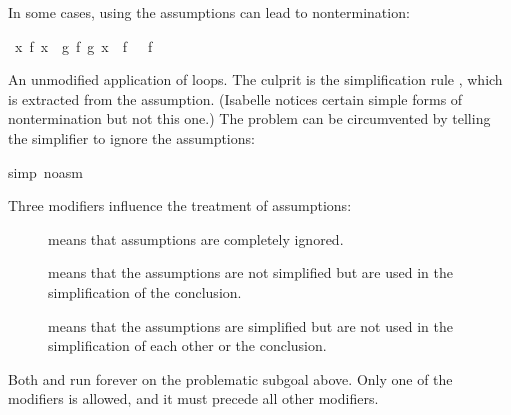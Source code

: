 \begin{isabellebody}
\begin{isamarkuptext}
In some cases, using the assumptions can lead to nontermination:%
\end{isamarkuptext}%
\isamarkuptrue%
\ {\isachardoublequote}{\isasymforall}x{\isachardot}\ f\ x\ {\isacharequal}\ g\ {\isacharparenleft}f\ {\isacharparenleft}g\ x{\isacharparenright}{\isacharparenright}\ {\isasymLongrightarrow}\ f\ {\isacharbrackleft}{\isacharbrackright}\ {\isacharequal}\ f\ {\isacharbrackleft}{\isacharbrackright}\ {\isacharat}\ {\isacharbrackleft}{\isacharbrackright}{\isachardoublequote}\isamarkupfalse%
%
\begin{isamarkuptxt}%
\noindent
An unmodified application of  loops.  The culprit is the
simplification rule , which is extracted from
the assumption.  (Isabelle notices certain simple forms of
nontermination but not this one.)  The problem can be circumvented by
telling the simplifier to ignore the assumptions:%
\end{isamarkuptxt}%
\isamarkuptrue%
simp\ {\isacharparenleft}no{\isacharunderscore}asm{\isacharparenright}{\isacharparenright}\isanewline
\isamarkupfalse%
\isamarkupfalse%
%
\begin{isamarkuptext}%
\noindent
Three modifiers influence the treatment of assumptions:
\begin{description}
\item[]
 means that assumptions are completely ignored.
\item[]
 means that the assumptions are not simplified but
  are used in the simplification of the conclusion.
\item[]
 means that the assumptions are simplified but are not
  used in the simplification of each other or the conclusion.
\end{description}
Both  and  run forever on
the problematic subgoal above.
Only one of the modifiers is allowed, and it must precede all
other modifiers.


\end{isamarkuptext}
\end{isabellebody}
